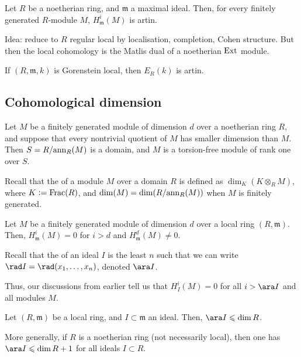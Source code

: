 \documentclass[12pt]{article}
\begin{document}
\begin{cor} \label{cor:local-cohomology-maximal-artin}
	Let $R$ be a noetherian ring, and $\mathfrak{m}$ a maximal ideal. Then, for every finitely generated $R$-module $M$, $H_{\mathfrak{m}}^{i}(M)$ is artin.
\end{cor}
Idea: reduce to $R$ regular local by localisation, completion, Cohen structure. But then the local cohomology is the Matlis dual of a noetherian $\operatorname{Ext}$ module.

\begin{cor}
	If $(R, \mathfrak{m}, k)$ is Gorenstein local, then $E_{R}(k)$ is artin.
\end{cor}

\subsection{Cohomological dimension}

\begin{lem} 
	Let $M$ be a finitely generated module of dimension $d$ over a noetherian ring $R$, and suppose that every nontrivial quotient of $M$ has smaller dimension than $M$. Then $S = R/{\operatorname{ann}_{R}(M)}$ is a domain, and $M$ is a torsion-free module of rank one over $S$.
\end{lem}
Recall that the  of a module $M$ over a domain $R$ is defined as $\dim_{K}(K \otimes_{R} M)$, where $K \vcentcolon= \operatorname{Frac}(R)$, and $\dim(M) = \dim(R/{\operatorname{ann}_{R}(M)})$ when $M$ is finitely generated.

\begin{thm}
	Let $M$ be a finitely generated module of dimension $d$ over a local ring $(R, \mathfrak{m})$. Then, $H_{\mathfrak{m}}^{i}(M) = 0$ for $i > d$ and $H_{\mathfrak{m}}^{d}(M) \neq 0$.
\end{thm}

Recall that the  of an ideal $I$ is the least $n$ such that we can write $\rad I = \rad (x_{1}, \ldots, x_{n})$, denoted $\ara I$. 

Thus, our discussions from earlier tell us that $H_{I}^{i}(M) = 0$ for all $i > \ara I$ and all modules $M$.

\begin{lem}
	Let $(R, \mathfrak{m})$ be a local ring, and $I \subset \mathfrak{m}$ an ideal. Then, $\ara I \le \dim R$.
\end{lem}
More generally, if $R$ is a noetherian ring (not necessarily local), then one has $\ara I \le \dim R + 1$ for all ideals $I \subset R$.
\end{document}
